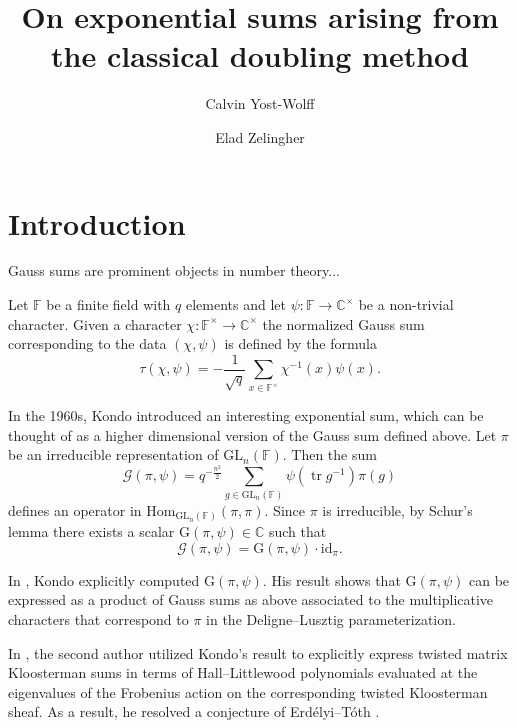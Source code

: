 \documentclass[12pt, reqno]{amsart}
\title[Doubling method exponential sums]{On exponential sums arising from the classical doubling method}
\author{Calvin Yost-Wolff}
\author{Elad Zelingher}
\theoremstyle{definition}
\theoremstyle{definition}
\theoremstyle{definition}
\newcommand{\cComplex}{\mathbb{C}}
\newcommand{\multiplicativegroup}[1]{#1^{\times}}
\newcommand{\Hom}{\mathrm{Hom}}
\newcommand{\idmap}{\mathrm{id}}
\newcommand{\Erdelyi}{Erd{\'e}lyi}
\newcommand{\Toth}{T{\'o}th}
\newcommand{\fieldCharacter}{\psi}
\newcommand{\trace}{\operatorname{tr}}
\newcommand{\GL}{\mathrm{GL}}
\newcommand{\finiteField}{\mathbb{F}}
\newcommand{\GaussSum}[2]{\mathcal{G}\left(#1, #2\right)}
\newcommand{\GaussSumSingleCharacter}[2]{\tau\left(#1, #2\right)}
\newcommand{\GaussSumScalar}[2]{\mathrm{G}\left(#1, #2\right)}
\begin{document}

\begin{abstract}
\end{abstract}
\maketitle

\tableofcontents

\section{Introduction}

Gauss sums are prominent objects in number theory...

Let $\finiteField$ be a finite field with $q$ elements and let $\fieldCharacter \colon \finiteField \to \multiplicativegroup{\cComplex}$ be a non-trivial character. Given a character $\chi \colon \multiplicativegroup{\finiteField} \to \multiplicativegroup{\cComplex}$ the normalized Gauss sum corresponding to the data $\left(\chi, \fieldCharacter\right)$ is defined by the formula
$$\GaussSumSingleCharacter{\chi}{\fieldCharacter} = -\frac{1}{\sqrt{q}}\sum_{x \in \multiplicativegroup{\finiteField}} \chi^{-1}\left(x\right) \fieldCharacter\left(x\right).$$

In the 1960s, Kondo \cite{Kondo1963} introduced an interesting exponential sum, which can be thought of as a higher dimensional version of the Gauss sum defined above. Let $\pi$ be an irreducible representation of $\GL_n\left(\finiteField\right)$. Then the sum $$\GaussSum{\pi}{\fieldCharacter} = q^{-\frac{n^2}{2}} \sum_{g \in \GL_n\left(\finiteField\right)} \fieldCharacter\left(\trace g^{-1}\right) \pi\left(g\right)$$
defines an operator in $\Hom_{\GL_n\left(\finiteField\right)}\left(\pi, \pi\right)$. Since $\pi$ is irreducible, by Schur's lemma there exists a scalar $\GaussSumScalar{\pi}{\fieldCharacter} \in \cComplex$ such that $$\GaussSum{\pi}{\fieldCharacter} = \GaussSumScalar{\pi}{\fieldCharacter} \cdot \idmap_{\pi}.$$

In \cite{Kondo1963}, Kondo explicitly computed $\GaussSumScalar{\pi}{\fieldCharacter}$. His result shows that $\GaussSumScalar{\pi}{\fieldCharacter}$ can be expressed as a product of Gauss sums as above associated to the multiplicative characters that correspond to $\pi$ in the Deligne--Lusztig parameterization.

In \cite{Zelingher2024}, the second author utilized Kondo's result to explicitly express twisted matrix Kloosterman sums in terms of Hall--Littlewood polynomials evaluated at the eigenvalues of the Frobenius action on the corresponding twisted Kloosterman sheaf. As a result, he resolved a conjecture of \Erdelyi{}--\Toth{} \cite{ErdelyiToth2024}.
\end{document}
